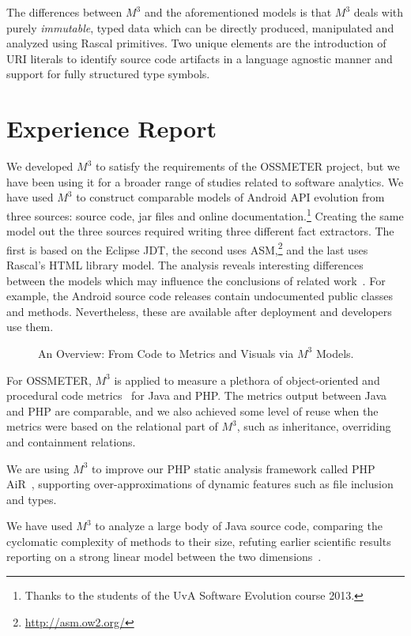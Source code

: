 \documentclass[conference]{IEEEtran}
\newcommand{\mthree}{\ensuremath{M^3}\!\xspace}
\begin{document}
The differences between \mthree and the aforementioned models is that \mthree
deals with purely \emph{immutable}, typed data which can be directly
produced, manipulated and analyzed using Rascal primitives. Two unique
elements are the introduction of URI literals to identify source code
artifacts in a language agnostic manner and support for fully structured type
symbols.

\section{Experience Report}

We developed \mthree to satisfy the requirements of the OSSMETER project, but
we have been using it for a broader range of studies related to software
analytics.
%
We have used \mthree to construct comparable models of Android API evolution
from three sources: source code, jar files and online
documentation.\!\footnote{Thanks to the students of the UvA Software
Evolution course 2013.}
Creating the same model out the three sources required writing three different
fact extractors. The first is based on the Eclipse JDT, the second uses
ASM,\!\footnote{\url{http://asm.ow2.org/}} and the last uses Rascal's HTML
library model. The analysis reveals interesting differences between the models
which may influence the conclusions of related work~\cite{apianalysis}. For example, the Android source code releases contain undocumented public classes and methods. Nevertheless, these are available after deployment and developers use them. 

\begin{figure}[t]
\centering
	\resizebox{.8\columnwidth}{!}{}
\caption{An Overview: From Code to Metrics and Visuals via \mthree Models.}
\vspace{-5mm}
\end{figure}
For OSSMETER, \mthree is applied to measure a plethora of object-oriented and
procedural code metrics~\cite{mood,ck} for Java and PHP. The metrics output
between Java and PHP are comparable, and we also achieved some level of reuse
when the metrics were based on the relational part of \mthree, such as
inheritance, overriding and containment relations.

We are using \mthree to improve our PHP static analysis framework called PHP
AiR~\cite{phpair}, supporting over-approximations of dynamic features such as
file inclusion~\cite{ase2014} and types.

We have used \mthree to analyze a large body of Java source code, comparing
the cyclomatic complexity of methods to their size, refuting earlier
scientific results reporting on a strong linear model between the two
dimensions~\cite{davy}.
\end{document}

